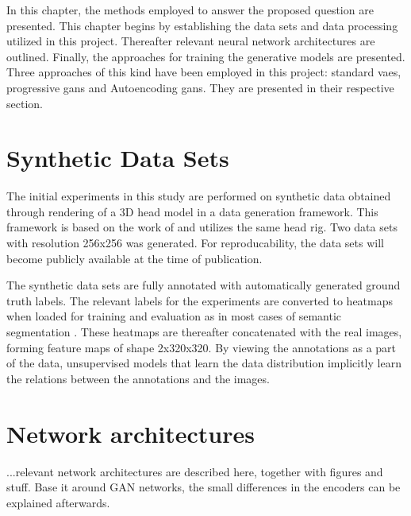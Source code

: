 In this chapter, the methods employed to answer the proposed question are presented. This chapter begins by establishing the data sets and data processing utilized in this project. Thereafter relevant neural network architectures are outlined. Finally, the approaches for training the generative models are presented. Three approaches of this kind have been employed in this project: standard \acrshort{vaes}, progressive \acrshort{gans} and Autoencoding \acrshort{gans}. They are presented in their respective section.

\section{Synthetic Data Sets}
The initial experiments in this study are performed on synthetic data obtained through rendering of a 3D head model in a data generation framework. This framework is based on the work of \textcite{swirski2014rendering} and utilizes the same head rig. Two data sets with resolution 256x256 was generated. For reproducability, the data sets will become publicly available at the time of publication.

The synthetic data sets are fully annotated with automatically generated ground truth labels. The relevant labels for the experiments are converted to heatmaps when loaded for training and evaluation as in most cases of semantic segmentation \parencite{guo2017review}. These heatmaps are thereafter concatenated with the real images, forming feature maps of shape 2x320x320. By viewing the annotations as a part of the data, unsupervised models that learn the data distribution implicitly learn the relations between the annotations and the images.

\section{Network architectures}
...relevant network architectures are described here, together with figures and stuff. Base it around GAN networks, the small differences in the encoders can be explained afterwards.


